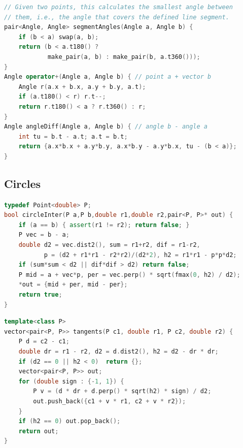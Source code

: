 \begin{multicols}{\Columns}
\begin{lstlisting}[language=C++]
// Given two points, this calculates the smallest angle between
// them, i.e., the angle that covers the defined line segment.
pair<Angle, Angle> segmentAngles(Angle a, Angle b) {
	if (b < a) swap(a, b);
	return (b < a.t180() ?
	        make_pair(a, b) : make_pair(b, a.t360()));
}
Angle operator+(Angle a, Angle b) { // point a + vector b
	Angle r(a.x + b.x, a.y + b.y, a.t);
	if (a.t180() < r) r.t--;
	return r.t180() < a ? r.t360() : r;
}
Angle angleDiff(Angle a, Angle b) { // angle b - angle a
	int tu = b.t - a.t; a.t = b.t;
	return {a.x*b.x + a.y*b.y, a.x*b.y - a.y*b.x, tu - (b < a)};
}
\end{lstlisting}


\subsection{Circles}
\begin{lstlisting}[language=C++]
typedef Point<double> P;
bool circleInter(P a,P b,double r1,double r2,pair<P, P>* out) {
	if (a == b) { assert(r1 != r2); return false; }
	P vec = b - a;
	double d2 = vec.dist2(), sum = r1+r2, dif = r1-r2,
	       p = (d2 + r1*r1 - r2*r2)/(d2*2), h2 = r1*r1 - p*p*d2;
	if (sum*sum < d2 || dif*dif > d2) return false;
	P mid = a + vec*p, per = vec.perp() * sqrt(fmax(0, h2) / d2);
	*out = {mid + per, mid - per};
	return true;
}
\end{lstlisting}

\begin{lstlisting}[language=C++]
template<class P>
vector<pair<P, P>> tangents(P c1, double r1, P c2, double r2) {
	P d = c2 - c1;
	double dr = r1 - r2, d2 = d.dist2(), h2 = d2 - dr * dr;
	if (d2 == 0 || h2 < 0)  return {};
	vector<pair<P, P>> out;
	for (double sign : {-1, 1}) {
		P v = (d * dr + d.perp() * sqrt(h2) * sign) / d2;
		out.push_back({c1 + v * r1, c2 + v * r2});
	}
	if (h2 == 0) out.pop_back();
	return out;
}
\end{lstlisting}


\end{multicols}
